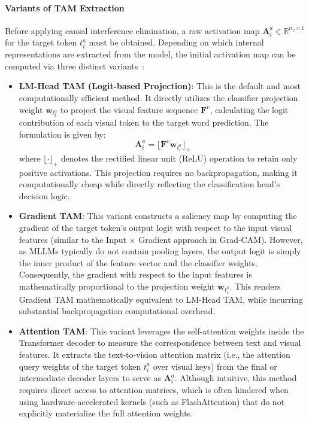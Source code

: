 \documentclass[12pt, conference, letterpaper]{IEEEtran}
\begin{document}
\paragraph{Variants of TAM Extraction}
Before applying causal interference elimination, a raw activation map $\mathbf{A}^a_i \in \mathbb{R}^{n_v \times 1}$ for the target token $t^a_i$ must be obtained. Depending on which internal representations are extracted from the model, the initial activation map can be computed via three distinct variants~\cite{li2025token}:

\begin{itemize}
    \item \textbf{LM-Head TAM (Logit-based Projection)}: 
    This is the default and most computationally efficient method. It directly utilizes the classifier projection weight $\mathbf{w}_{t^a_i}$ to project the visual feature sequence $\mathbf{F}^v$, calculating the logit contribution of each visual token to the target word prediction. The formulation is given by:
    \begin{equation}
        \mathbf{A}^a_i = \lfloor \mathbf{F}^v \mathbf{w}_{t^a_i} \rfloor_+
    \end{equation}
    where $\lfloor \cdot \rfloor_+$ denotes the rectified linear unit (ReLU) operation to retain only positive activations. This projection requires no backpropagation, making it computationally cheap while directly reflecting the classification head's decision logic.

    \item \textbf{Gradient TAM}: 
    This variant constructs a saliency map by computing the gradient of the target token's output logit with respect to the input visual features (similar to the Input $\times$ Gradient approach in Grad-CAM). However, as MLLMs typically do not contain pooling layers, the output logit is simply the inner product of the feature vector and the classifier weights. Consequently, the gradient with respect to the input features is mathematically proportional to the projection weight $\mathbf{w}_{t^a_i}$. This renders Gradient TAM mathematically equivalent to LM-Head TAM, while incurring substantial backpropagation computational overhead.

    \item \textbf{Attention TAM}: 
    This variant leverages the self-attention weights inside the Transformer decoder to measure the correspondence between text and visual features. It extracts the text-to-vision attention matrix (i.e., the attention query weights of the target token $t^a_i$ over visual keys) from the final or intermediate decoder layers to serve as $\mathbf{A}^a_i$. Although intuitive, this method requires direct access to attention matrices, which is often hindered when using hardware-accelerated kernels (such as FlashAttention) that do not explicitly materialize the full attention weights.
\end{itemize}
\end{document}

